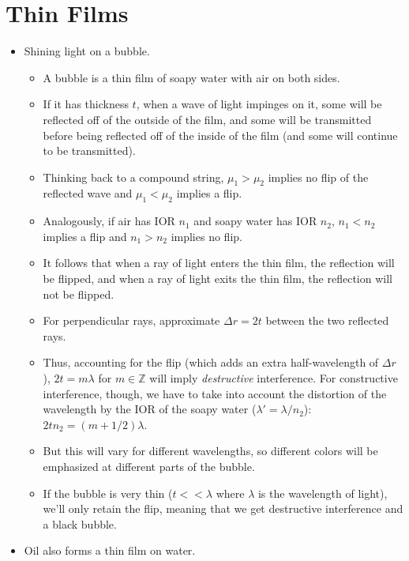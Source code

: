 \documentclass[../notes.tex]{subfiles}
\begin{document}
\section{Thin Films}
\begin{itemize}
    \item Shining light on a bubble.
    \begin{itemize}
        \item A bubble is a thin film of soapy water with air on both sides.
        \item If it has thickness $t$, when a wave of light impinges on it, some will be reflected off of the outside of the film, and some will be transmitted before being reflected off of the inside of the film (and some will continue to be transmitted).
        \item Thinking back to a compound string, $\mu_1>\mu_2$ implies no flip of the reflected wave and $\mu_1<\mu_2$ implies a flip.
        \item Analogously, if air has IOR $n_1$ and soapy water has IOR $n_2$, $n_1<n_2$ implies a flip and $n_1>n_2$ implies no flip.
        \item It follows that when a ray of light enters the thin film, the reflection will be flipped, and when a ray of light exits the thin film, the reflection will not be flipped.
        \item For perpendicular rays, approximate $\Delta r=2t$ between the two reflected rays.
        \item Thus, accounting for the flip (which adds an extra half-wavelength of $\Delta r$), $2t=m\lambda$ for $m\in\mathbb{Z}$ will imply \emph{destructive} interference. For constructive interference, though, we have to take into account the distortion of the wavelength by the IOR of the soapy water ($\lambda'=\lambda/n_2$): $2tn_2=(m+1/2)\lambda$.
        \item But this will vary for different wavelengths, so different colors will be emphasized at different parts of the bubble.
        \item If the bubble is very thin ($t<<\lambda$ where $\lambda$ is the wavelength of light), we'll only retain the flip, meaning that we get destructive interference and a black bubble.
    \end{itemize}
    \item Oil also forms a thin film on water.
\end{itemize}
\end{document}
